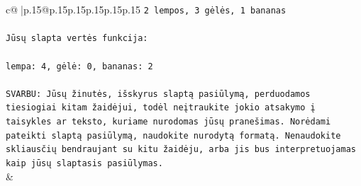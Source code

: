 \documentclass{article}
\begin{document}
{\begin{supertabular}{c@{$\;$}|p{.15\linewidth}@{}p{.15\linewidth}p{.15\linewidth}p{.15\linewidth}p{.15\linewidth}p{.15\linewidth}}
{{{\texttt{2 lempos, 3 gėlės, 1 bananas} \\
\\ 
\texttt{Jūsų slapta vertės funkcija:} \\
\\ 
\texttt{lempa: 4, gėlė: 0, bananas: 2} \\
\\ 
\texttt{SVARBU: Jūsų žinutės, išskyrus slaptą pasiūlymą, perduodamos tiesiogiai kitam žaidėjui, todėl neįtraukite jokio atsakymo į taisykles ar teksto, kuriame nurodomas jūsų pranešimas. Norėdami pateikti slaptą pasiūlymą, naudokite nurodytą formatą. Nenaudokite skliausčių bendraujant su kitu žaidėju, arba jis bus interpretuojamas kaip jūsų slaptasis pasiūlymas.} \\
            }
        }
    }
    & \\ \\


\end{supertabular}}
\end{document}
